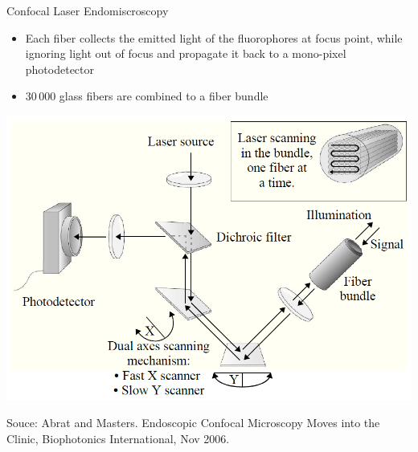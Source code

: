 \begin{frame}{Confocal Laser Endomiscroscopy}

	\begin{itemize}
		\item Each fiber collects the emitted light of the fluorophores at focus point, while ignoring
		      light out of focus and propagate it back to a mono-pixel photodetector
		\item 30\,000 glass fibers are combined to a fiber
		      bundle
	\end{itemize}

	\begin{center}
		\includegraphics[height=0.6\textheight]{img2/pcle.png}

		\tiny{Souce: Abrat and Masters. Endoscopic Confocal Microscopy Moves into the
			Clinic, Biophotonics International, Nov 2006.}
	\end{center}
	\normalsize

\end{frame}
%
%

